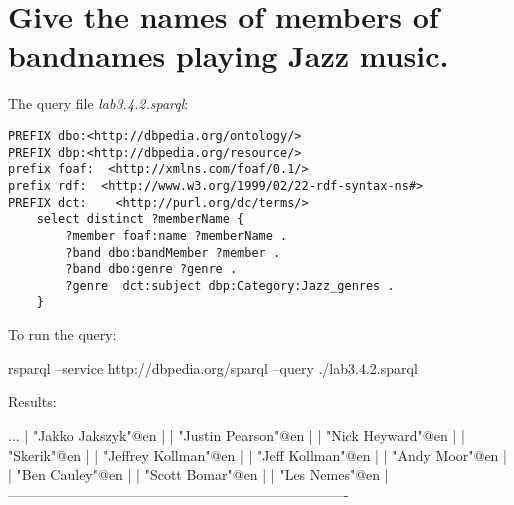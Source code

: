 \documentclass[a4paper, 12pt]{report}
\begin{document}
\section{Give the names of members of bandnames playing Jazz music.}
The query file \emph{lab3.4.2.sparql}:
\begin{lstlisting}[frame=single]
PREFIX dbo:<http://dbpedia.org/ontology/>
PREFIX dbp:<http://dbpedia.org/resource/>
prefix foaf:  <http://xmlns.com/foaf/0.1/>
prefix rdf:  <http://www.w3.org/1999/02/22-rdf-syntax-ns#>
PREFIX dct:    <http://purl.org/dc/terms/>
    select distinct ?memberName {
        ?member foaf:name ?memberName .
        ?band dbo:bandMember ?member .
        ?band dbo:genre ?genre .
        ?genre  dct:subject dbp:Category:Jazz_genres .
    }
\end{lstlisting}
To run the query:
\begin{commandshell}
    rsparql --service http://dbpedia.org/sparql --query ./lab3.4.2.sparql
\end{commandshell}
Results:
\begin{messageshell}
...
| "Jakko Jakszyk"@en                                                    |
| "Justin Pearson"@en                                                   |
| "Nick Heyward"@en                                                     |
| "Skerik"@en                                                           |
| "Jeffrey Kollman"@en                                                  |
| "Jeff Kollman"@en                                                     |
| "Andy Moor"@en                                                        |
| "Ben Cauley"@en                                                       |
| "Scott Bomar"@en                                                      |
| "Les Nemes"@en                                                        |
-------------------------------------------------------------------------
\end{messageshell}
\end{document}
